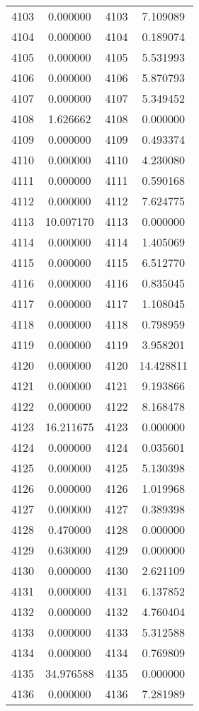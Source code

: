 \documentclass[12pt]{article}
\begin{document}
\begin{longtable}{@{}cccc@{}}
4103 & 0.000000 & 4103 & 7.109089 \\
4104 & 0.000000 & 4104 & 0.189074 \\
4105 & 0.000000 & 4105 & 5.531993 \\
4106 & 0.000000 & 4106 & 5.870793 \\
4107 & 0.000000 & 4107 & 5.349452 \\
4108 & 1.626662 & 4108 & 0.000000 \\
4109 & 0.000000 & 4109 & 0.493374 \\
4110 & 0.000000 & 4110 & 4.230080 \\
4111 & 0.000000 & 4111 & 0.590168 \\
4112 & 0.000000 & 4112 & 7.624775 \\
4113 & 10.007170 & 4113 & 0.000000 \\
4114 & 0.000000 & 4114 & 1.405069 \\
4115 & 0.000000 & 4115 & 6.512770 \\
4116 & 0.000000 & 4116 & 0.835045 \\
4117 & 0.000000 & 4117 & 1.108045 \\
4118 & 0.000000 & 4118 & 0.798959 \\
4119 & 0.000000 & 4119 & 3.958201 \\
4120 & 0.000000 & 4120 & 14.428811 \\
4121 & 0.000000 & 4121 & 9.193866 \\
4122 & 0.000000 & 4122 & 8.168478 \\
4123 & 16.211675 & 4123 & 0.000000 \\
4124 & 0.000000 & 4124 & 0.035601 \\
4125 & 0.000000 & 4125 & 5.130398 \\
4126 & 0.000000 & 4126 & 1.019968 \\
4127 & 0.000000 & 4127 & 0.389398 \\
4128 & 0.470000 & 4128 & 0.000000 \\
4129 & 0.630000 & 4129 & 0.000000 \\
4130 & 0.000000 & 4130 & 2.621109 \\
4131 & 0.000000 & 4131 & 6.137852 \\
4132 & 0.000000 & 4132 & 4.760404 \\
4133 & 0.000000 & 4133 & 5.312588 \\
4134 & 0.000000 & 4134 & 0.769809 \\
4135 & 34.976588 & 4135 & 0.000000 \\
4136 & 0.000000 & 4136 & 7.281989 \\

\end{longtable}
\end{document}
